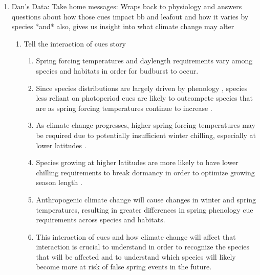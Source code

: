 \documentclass{article}\usepackage[]{graphicx}\usepackage[]{color}
\begin{document}
\begin{enumerate}
\item Dan's Data: Take home messages: Wraps back to physiology and answers questions about how those cues impact bb and leafout and how it varies by species *and* also, gives us insight into what climate change may alter
\begin{enumerate}
\item Tell the interaction of cues story
\begin{enumerate}
\item Spring forcing temperatures and daylength requirements vary among species and habitats in order for budburst to occur.
\item Since species distributions are largely driven by phenology \citep{Chuine2001}, species less reliant on photoperiod cues are likely to outcompete species that are as spring forcing temperatures continue to increase \citep{Vitasse2011, Gauzere2017}.
\item As climate change progresses, higher spring forcing temperatures may be required due to potentially insufficient winter chilling, especially at lower latitudes \citep{McCreary1990, Morin2009, Fu2012, Polgar2014, Chuine2010}. 
\item Species growing at higher latitudes are more likely to have lower chilling requirements to break dormancy \citep{Myking1995, Howe2003} in order to optimize growing season length \citep{Prevey2017}. 
\item Anthropogenic climate change will cause changes in winter and spring temperatures, resulting in greater differences in spring phenology cue requirements across species and habitats. 
\item This interaction of cues and how climate change will affect that interaction is crucial to understand in order to recognize the species that will be affected and to understand which species will likely become more at risk of false spring events in the future. 

\end{enumerate}



\end{enumerate}
\end{enumerate}
\end{document}
